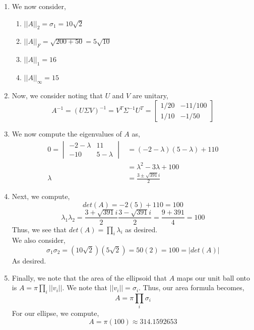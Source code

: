 \documentclass[letterpaper,10pt]{article}
\begin{document}
\begin{enumerate}
\begin{enumerate}
\begin{center}
\end{center}
\item We now consider,
\begin{enumerate}
\item $||A||_2=\sigma_1=10\sqrt{2}$
\item $||A||_F=\sqrt{200+50}=5\sqrt{10}$
\item $||A||_1=16$
\item $||A||_{\infty}=15$
\end{enumerate}
\item Now, we consider noting that $U$ and $V$ are unitary,
\[A^{-1}=(U\Sigma V)^{-1}=V^T \Sigma^{-1} U^T=\begin{bmatrix}
1/20 & -11/100\\ 1/10 & -1/50
\end{bmatrix}\]
\item We now compute the eigenvalues of $A$ as,
\begin{align*}
0=\begin{vmatrix}
-2-\lambda & 11\\
-10 & 5-\lambda
\end{vmatrix}&=(-2-\lambda)(5-\lambda)+110\\
&=\lambda^2-3\lambda+100\\
\lambda &= \frac{3\pm \sqrt{391}i}{2}
\end{align*}
\item Next, we compute,
\[det(A)=-2(5)+110=100\]
\[\lambda_1\lambda_2=\frac{3+\sqrt{391}i}{2}\frac{3-\sqrt{391}i}{2}=\frac{9+391}{4}=100\]
Thus, we see that $det(A)=\prod_i \lambda_i$ as desired.\\
We also consider, 
\[\sigma_1\sigma_2=(10\sqrt{2})(5\sqrt{2})=50(2)=100=|det(A)|\]
As desired.
\item Finally, we note that the area of the ellipsoid that $A$ maps our unit ball onto is $A=\pi \prod_i||v_i||$. We note that $||v_i||=\sigma_i$. Thus, our area formula becomes,
\[A=\pi\prod_i\sigma_i\]
For our ellipse, we compute,
\[A=\pi(100)\approx 314.1592653\] 
\end{enumerate}
\end{enumerate}
\end{document}
